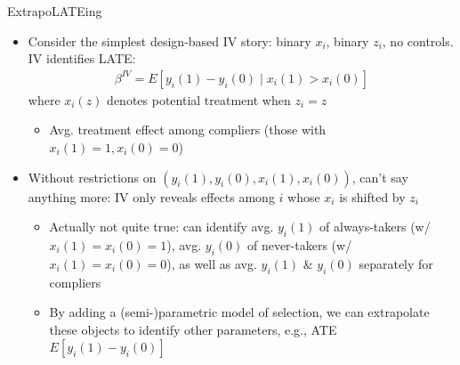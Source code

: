 \documentclass[11pt,english]{beamer}
\begin{document}
\begin{frame}{ExtrapoLATEing}

\begin{itemize}
\item Consider the simplest design-based IV story: binary $x_i$, binary $z_i$, no controls. IV identifies LATE:
\begin{align*}
\beta^{IV} = E[y_i(1)-y_i(0)\mid x_i(1)>x_i(0)]
\end{align*}
where $x_i(z)$ denotes potential treatment when $z_i=z$\smallskip
\begin{itemize}
\item Avg. treatment effect among compliers (those with $x_i(1)=1, x_i(0)=0$)
\end{itemize}\bigskip\pause{}
\item Without restrictions on $(y_i(1),y_i(0),x_i(1),x_i(0))$, can't say anything more: IV only reveals effects among $i$ whose $x_i$ is shifted by $z_i$\smallskip\pause{}
\begin{itemize}
\item Actually not quite true: can identify avg. $y_i(1)$ of always-takers (w/ $x_i(1)=x_i(0)=1$), avg. $y_i(0)$ of never-takers (w/ $x_i(1)=x_i(0)=0$), as well as avg. $y_i(1)$ \& $y_i(0)$ separately for compliers 
\smallskip
\item By adding a (semi-)parametric model of selection, we can extrapolate these objects to identify other parameters, e.g., ATE $E[y_i(1)-y_i(0)]$
\end{itemize}
\end{itemize}
\end{frame}
\end{document}
